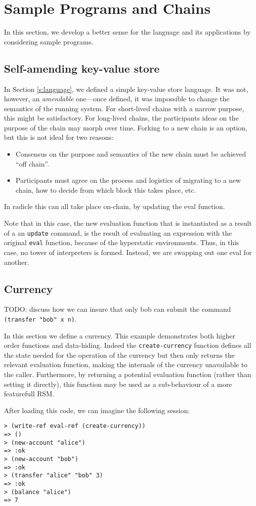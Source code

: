 \section{Sample Programs and Chains}
\label{s:examples}

In this section, we develop a better sense for the language and its
applications by considering sample programs.

\subsection{Self-amending key-value store}

In Section \ref{s:language}, we defined a simple key-value store language. It
was not, however, an \emph{amendable} one---once defined, it was impossible to
change the semantics of the running system. For short-lived chains with a narrow
purpose, this might be satisfactory. For long-lived chains, the participants
ideas on the purpose of the chain may morph over time. Forking to a new chain is
an option, but this is not ideal for two reasons:
\begin{itemize}
  \item Consensus on the purpose and semantics of the new chain must be achieved
    ``off chain''.
  \item Participants must agree on the process and logistics of migrating to a
    new chain, how to decide from which block this takes place, etc.
\end{itemize}
In radicle this can all take place on-chain, by updating the eval function.

Note that in this case, the new evaluation function that is instantiated as a
result of a an \texttt{update} command, is the result of evaluating an
expression with the original \texttt{eval} function, because of the hyperstatic
environments. Thus, in this case, no tower of interpreters is formed. Instead,
we are swapping out one eval for another.

\subsection{Currency}

TODO: discuss how we can insure that only bob can submit the command
\texttt{(transfer "bob" x n)}.

In this section we define a currency. This example demonstrates both higher
order functions and data-hiding. Indeed the \texttt{create-currency} function
defines all the state needed for the operation of the currency but then only
returns the relevant evaluation function, making the internals of the currency
unavailable to the caller. Furthermore, by returning a potential evaluation
function (rather than setting it directly), this function may be used as a
sub-behaviour of a more featurefull RSM.

After loading this code, we can imagine the following \rad{} session:
\bigskip
\begin{Verbatim}[fontsize=\small]
> (write-ref eval-ref (create-currency))
=> ()
> (new-account "alice")
=> :ok
> (new-account "bob")
=> :ok
> (transfer "alice" "bob" 3)
=> :ok
> (balance "alice")
=> 7
\end{Verbatim}

